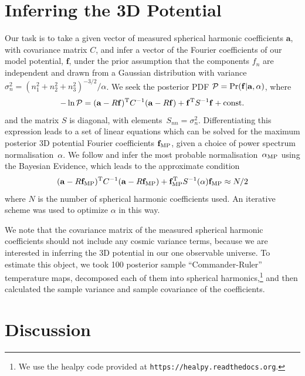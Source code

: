 \documentclass[12pt]{article}
\def\Response{R_{yn}}
\def\ResponseMatrix{R}
\begin{document}
\section{Inferring the 3D Potential}

Our task is to take a given vector of measured spherical harmonic
coefficients $\mathbf{a}$, with covariance matrix $C$,  and
infer a vector of the Fourier coefficients of our model potential,
$\mathbf{f}$,  under the prior assumption that the  components $f_n$
are independent and drawn from a Gaussian distribution with variance
$\sigma_n^2 = (n_1^2+n_2^2+n_3^2)^{-3/2} / \alpha$. We seek the
posterior PDF ${\cal P} = \Pr(\mathbf{f}|\mathbf{a},\alpha)$, where
\begin{equation}
-\ln{\cal P} = (\mathbf{a}-\ResponseMatrix\mathbf{f})^{\rm T} C^{-1} (\mathbf{a}-\ResponseMatrix\mathbf{f})
             + \mathbf{f}^{\rm T} S^{-1} \mathbf{f} + \text{const.}
\end{equation}
and the matrix $S$ is diagonal, with
elements~$S_{nn} = \sigma_n^2$.
Differentiating this expression leads to a set of linear equations
which can be solved for the maximum posterior 3D potential
Fourier coefficients $\mathbf{f}_{\rm MP}$, given a choice of power spectrum
normalisation~$\alpha$. We follow \citep{SuyuEtal2006} and infer the
most probable normalisation~$\alpha_{\rm MP}$ using the Bayesian Evidence,
which leads to the approximate condition
\begin{equation}
    (\mathbf{a}-\ResponseMatrix\mathbf{f}_{\rm MP})^{\rm T} C^{-1} (\mathbf{a}-\ResponseMatrix\mathbf{f}_{\rm MP})
                 + \mathbf{f}_{\rm MP}^{\rm T} S^{-1}(\alpha) \mathbf{f}_{\rm MP} \approx N/2
\end{equation}
where $N$ is the number of spherical harmonic coefficients used. An
iterative scheme was used to optimize $\alpha$ in this way.

We note that the covariance matrix of the measured spherical harmonic
coefficients should not include any cosmic variance terms, because we
are interested in inferring the 3D potential in our one observable
universe. To estimate this object, we took 100 posterior sample
``Commander-Ruler'' temperature maps, decomposed each of them into
spherical harmonics,\footnote{We use the {\sc healpy} code provided at
\texttt{https://healpy.readthedocs.org}.} and then calculated the
sample variance and sample covariance of the coefficients.


\section{Discussion}




\end{document}
